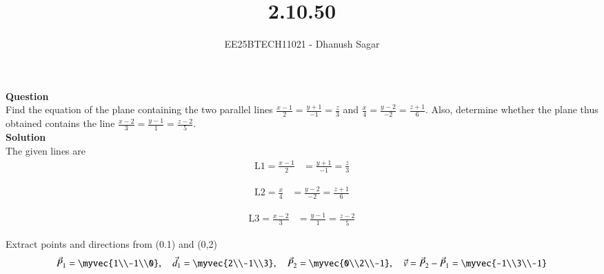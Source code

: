 \documentclass[journal]{IEEEtran}
\begin{document}



\title{2.10.50}
\author{EE25BTECH11021 - Dhanush Sagar}
{\let\newpage\relax\maketitle}

\renewcommand{\thefigure}{\theenumi}
\renewcommand{\thetable}{\theenumi}
\setlength{\intextsep}{10pt} %
\renewcommand{\thetable}{\theenumi}
\textbf{Question} \\
Find the equation of the plane containing the two parallel lines 
$\frac{x-1}{2} = \frac{y+1}{-1} = \frac{z}{3}$ and 
$\frac{x}{4} = \frac{y-2}{-2} = \frac{z+1}{6}$. 
Also, determine whether the plane thus obtained contains the line 
$\frac{x-2}{3} = \frac{y-1}{1} = \frac{z-2}{5}$.\\


\textbf{Solution} \\
\noindent The given lines are
\begin{align}
\text{L1} = \frac{x-1}{2} &= \frac{y+1}{-1} = \frac{z}{3}
\end{align}

\begin{align}
\text{L2} = \frac{x}{4} &= \frac{y-2}{-2} = \frac{z+1}{6}
\end{align}

\begin{align}
\text{L3} = \frac{x-2}{3} &= \frac{y-1}{1} = \frac{z-2}{5}
\end{align}

\noindent Extract points and directions from (0.1) and (0,2) 
\begin{align}
\vec{P}_1 = \myvec{1\\-1\\0},\quad \vec{d}_1 = \myvec{2\\-1\\3},\quad
\vec{P}_2 = \myvec{0\\2\\-1},\quad \vec{v} = \vec{P}_2 - \vec{P}_1 = \myvec{-1\\3\\-1}
\end{align}
\end{document}
